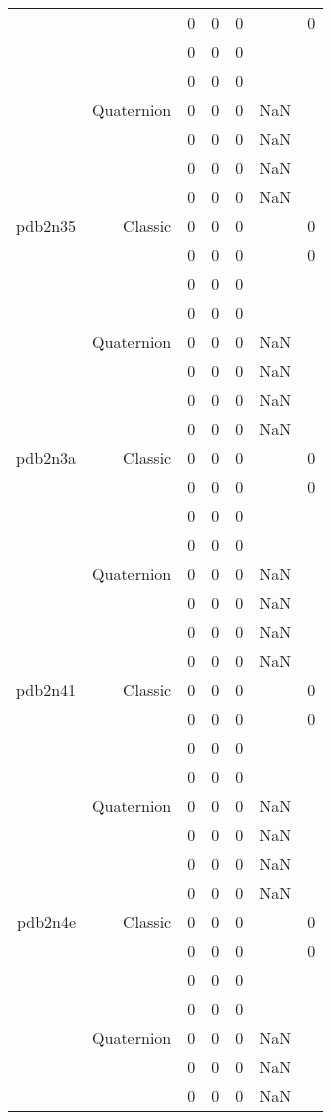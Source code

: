 \begin{xltabular}{\textwidth}{r|rcccSc}
& & 0 & 0 & 0 & & 0 \\
& & 0 & 0 & 0 & & \\
& & 0 & 0 & 0 & & \\
& Quaternion & 0 & 0 & 0 & NaN & \\
& & 0 & 0 & 0 & NaN & \\
& & 0 & 0 & 0 & NaN & \\
& & 0 & 0 & 0 & NaN & \\ \addlinespace
pdb2n35 & Classic & 0 & 0 & 0 & & 0 \\
& & 0 & 0 & 0 & & 0 \\
& & 0 & 0 & 0 & & \\
& & 0 & 0 & 0 & & \\
& Quaternion & 0 & 0 & 0 & NaN & \\
& & 0 & 0 & 0 & NaN & \\
& & 0 & 0 & 0 & NaN & \\
& & 0 & 0 & 0 & NaN & \\ \addlinespace
pdb2n3a & Classic & 0 & 0 & 0 & & 0 \\
& & 0 & 0 & 0 & & 0 \\
& & 0 & 0 & 0 & & \\
& & 0 & 0 & 0 & & \\
& Quaternion & 0 & 0 & 0 & NaN & \\
& & 0 & 0 & 0 & NaN & \\
& & 0 & 0 & 0 & NaN & \\
& & 0 & 0 & 0 & NaN & \\ \addlinespace
pdb2n41 & Classic & 0 & 0 & 0 & & 0 \\
& & 0 & 0 & 0 & & 0 \\
& & 0 & 0 & 0 & & \\
& & 0 & 0 & 0 & & \\
& Quaternion & 0 & 0 & 0 & NaN & \\
& & 0 & 0 & 0 & NaN & \\
& & 0 & 0 & 0 & NaN & \\
& & 0 & 0 & 0 & NaN & \\ \addlinespace
pdb2n4e & Classic & 0 & 0 & 0 & & 0 \\
& & 0 & 0 & 0 & & 0 \\
& & 0 & 0 & 0 & & \\
& & 0 & 0 & 0 & & \\
& Quaternion & 0 & 0 & 0 & NaN & \\
& & 0 & 0 & 0 & NaN & \\
& & 0 & 0 & 0 & NaN & \\

\end{xltabular}
